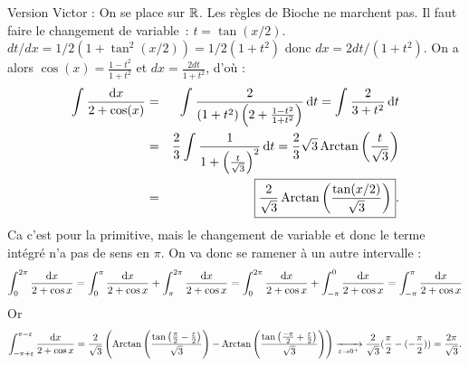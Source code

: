 \documentclass{magnolia}
\begin{document}
\begin{exoUnique}
\begin{sol}
\begin{itemize}
    Version Victor : On se place sur $\R$. Les règles de {\sc Bioche} ne marchent pas. Il faut
    faire le changement de variable~: $t=\tan(x/2)$. 
    $dt/dx=1/2(1+\tan^2(x/2))=1/2(1+t^2)$ donc $dx=2dt/(1+t^2)$. On a alors $\displaystyle \cos(x)=\frac{1-t^2}{1+t^2}$ et $\displaystyle dx=\frac{2dt}{1+t^2}$, d'où :
    \begin{eqnarray*}
    \priminv{2+\cos(x)}{x}&=&\prim{\frac{2}{(1+t^2)\p{2+\frac{1-t^2}{1+t^2}}}}{t}=\prim{\frac{2}{3+t^2}}{t}\\
    &=&\frac{2}{3}\prim{\frac{1}{1+\p{\frac{t}{\sqrt{3}}}^2}}{t}=\frac{2}{3}\sqrt{3}\arctan\p{\frac{t}{\sqrt{3}}}\\
    &=&\boxed{\frac{2}{\sqrt{3}}\arctan\p{\frac{\tan(x/2)}{\sqrt{3}}}}.
    \end{eqnarray*} 
Ca c'est pour la primitive, mais le changement de variable et donc le terme intégré n'a pas de sens en $\pi$. On va donc se ramener à un autre intervalle :
$$\integinv{0}{2\pi}{2+\cos x}{x}=\integinv{0}{\pi}{2+\cos x}{x}+\integinv{\pi}{2\pi}{2+\cos x}{x}=\integinv{0}{2\pi}{2+\cos x}{x}+\integinv{-\pi}{0}{2+\cos x}{x}=\integinv{-\pi}{\pi}{2+\cos x}{x}$$
Or $$\integinv{-\pi+\epsilon}{\pi-\epsilon}{2+\cos x}{x}=\frac{2}{\sqrt{3}}\p{\arctan\p{\frac{\tan\p{\frac{\pi}{2}-\frac{\epsilon}{2}}}{\sqrt{3}}}-\arctan\p{\frac{\tan\p{\frac{-\pi}{2}+\frac{\epsilon}{2}}}{\sqrt{3}}}}\tendvers{\epsilon}{0^+}\frac{2}{\sqrt{3}}(\frac{\pi}{2}-(-\frac{\pi}{2}))=\frac{2\pi}{\sqrt{3}}.$$

  \end{itemize}
  \end{sol}
\end{exoUnique}

\end{document}
